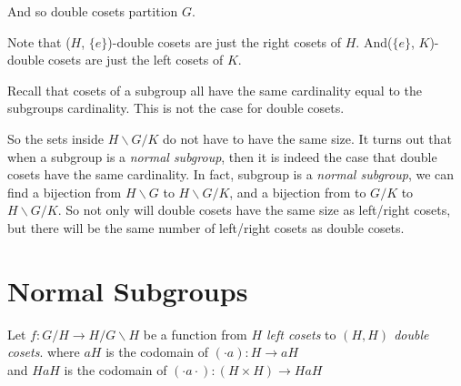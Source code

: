 And so double cosets partition $G$. 

\frmrule

Note that ($H$, $\{e\}$)-double cosets are just the right cosets of $H$. 
And($\{e\}$, $K$)-double cosets are just the left cosets of $K$. 

\frmrule

Recall that cosets of a subgroup all have the same cardinality equal to 
the subgroups cardinality. This is not the case for double cosets. 


So the sets inside $H\backslash G/K$ do not have to have the same size.
It turns out that when a subgroup is a \textit{normal subgroup}, then 
it is indeed the case that double cosets have the same cardinality. 
In fact, subgroup is a \textit{normal subgroup}, we can find a 
bijection from $H \backslash G$ to $H\backslash G/K$, and a bijection from 
to $G/K$ to $H\backslash G/K$. So not only will double cosets have the same size as left/right
cosets, but there will be the same number of left/right cosets as double cosets. 



\section{Normal Subgroups}

Let $f:G/H \rightarrow H/G\backslash H$ be a function from \textit{$H$ left cosets} to \textit{$(H,H)$ double cosets}. 
where $aH$ is the codomain of $(\cdot a): H \rightarrow aH$ \\
and $HaH$ is the codomain of $(\cdot a \cdot): (H \times H) \rightarrow HaH$ 

